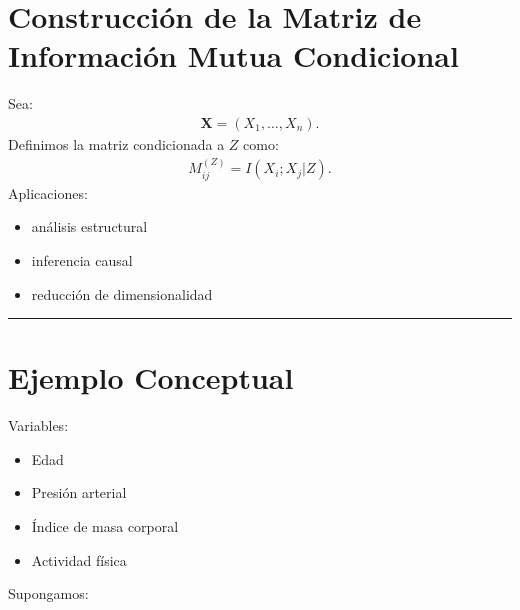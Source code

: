 \documentclass[letterpaper,10pt,english]{jupyterBook}
\begin{document}
\section{Construcción de la Matriz de Información Mutua Condicional}
\label{\detokenize{03_multivariate_models/conditional_mi:construccion-de-la-matriz-de-informacion-mutua-condicional}}
\sphinxAtStartPar
Sea:
\begin{equation*}
\begin{split}
\mathbf{X}=(X_1,\dots,X_n).
\end{split}
\end{equation*}
\sphinxAtStartPar
Definimos la matriz condicionada a \(Z\) como:
\begin{equation*}
\begin{split}
M_{ij}^{(Z)}=I(X_i;X_j|Z).
\end{split}
\end{equation*}
\sphinxAtStartPar
Aplicaciones:
\begin{itemize}
\item {} 
\sphinxAtStartPar
análisis estructural

\item {} 
\sphinxAtStartPar
inferencia causal

\item {} 
\sphinxAtStartPar
reducción de dimensionalidad

\end{itemize}


\bigskip\hrule\bigskip



\section{Ejemplo Conceptual}
\label{\detokenize{03_multivariate_models/conditional_mi:ejemplo-conceptual}}
\sphinxAtStartPar
Variables:
\begin{itemize}
\item {} 
\sphinxAtStartPar
Edad

\item {} 
\sphinxAtStartPar
Presión arterial

\item {} 
\sphinxAtStartPar
Índice de masa corporal

\item {} 
\sphinxAtStartPar
Actividad física

\end{itemize}

\sphinxAtStartPar
Supongamos:
\end{document}
